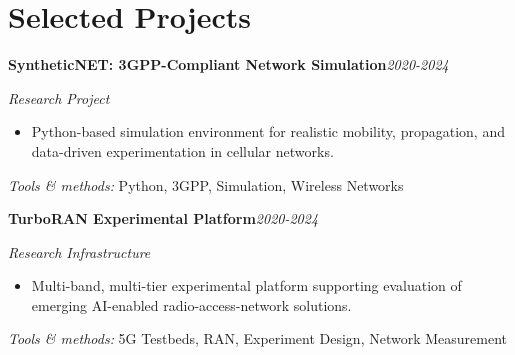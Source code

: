 \documentclass[9pt,letterpaper]{extarticle}
\newcommand{\entry}[2]{\Needspace{4\baselineskip}\textbf{#1}\hfill\textit{#2}\par}
\begin{document}
\section{Selected Projects}
\entry{SyntheticNET: 3GPP-Compliant Network Simulation}{2020-2024}
\textit{Research Project}\par
\begin{itemize}
\item Python-based simulation environment for realistic mobility, propagation, and data-driven experimentation in cellular networks.
\end{itemize}
{\small\textit{Tools \& methods:} Python, 3GPP, Simulation, Wireless Networks\par}
\entry{TurboRAN Experimental Platform}{2020-2024}
\textit{Research Infrastructure}\par
\begin{itemize}
\item Multi-band, multi-tier experimental platform supporting evaluation of emerging AI-enabled radio-access-network solutions.
\end{itemize}
{\small\textit{Tools \& methods:} 5G Testbeds, RAN, Experiment Design, Network Measurement\par}
\end{document}
